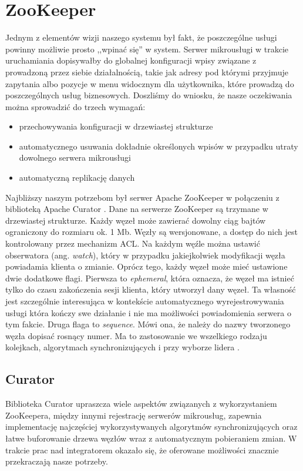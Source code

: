 \documentclass[licencjacka]{pracamgr}
\begin{document}
\section{ZooKeeper}

Jednym z elementów wizji naszego systemu był fakt, że poszczególne usługi
powinny możliwie prosto ,,wpinać się'' w system. Serwer mikrousługi w trakcie
uruchamiania dopisywałby do globalnej konfiguracji wpisy związane z prowadzoną
przez siebie działalnością, takie jak adresy pod którymi przyjmuje zapytania
albo pozycje w menu widocznym dla użytkownika, które prowadzą do poszczególnych
usług biznesowych. Doszliśmy do wniosku, że nasze oczekiwania można sprowadzić
do trzech wymagań:
\begin{itemize}
	\item przechowywania konfiguracji w drzewiastej strukturze
	\item automatycznego usuwania dokładnie określonych wpisów w przypadku
	utraty dowolnego serwera mikrousługi
	\item automatyczną replikację danych
\end{itemize}

Najbliższy naszym potrzebom był serwer Apache ZooKeeper \cite{zookeeper} w
połączeniu z biblioteką Apache Curator \cite{curator}. Dane na serwerze
ZooKeeper są trzymane w drzewiastej strukturze. Każdy węzeł może zawierać dowolny
ciąg bajtów ograniczony do rozmiaru ok. 1 Mb. Węzły są wersjonowane, a dostęp
do nich jest kontrolowany przez mechanizm ACL. Na każdym węźle można ustawić
obserwatora (ang. \textit{watch}), który w przypadku jakiejkolwiek modyfikacji
węzła powiadamia klienta o zmianie. Oprócz tego, każdy węzeł może mieć ustawione
dwie dodatkowe flagi. Pierwsza to \textit{ephemeral}, która oznacza, że węzeł ma
istnieć tylko do czasu zakończenia sesji klienta, który utworzył dany węzeł.
Ta własność jest szczególnie interesująca w kontekście automatycznego
wyrejestrowywania usługi która kończy swe działanie i nie ma możliwości
powiadomienia serwera o tym fakcie. Druga flaga to \textit{sequence}. Mówi ona,
że należy do nazwy tworzonego węzła dopisać rosnący numer. Ma to zastosowanie we
wszelkiego rodzaju kolejkach, algorytmach synchronizujących i przy wyborze
lidera \cite{curatorlock}.

\subsection{Curator}

Biblioteka Curator \cite{curator} upraszcza wiele aspektów związanych
z wykorzystaniem ZooKeepera, między innymi rejestrację serwerów mikrousług,
zapewnia implementację najczęściej wykorzystywanych algorytmów synchronizujących
oraz łatwe buforowanie drzewa węzłów wraz z automatycznym pobieraniem zmian. W
trakcie prac nad integratorem okazało się, że oferowane możliwości znacznie przekraczają
nasze potrzeby.
\end{document}
